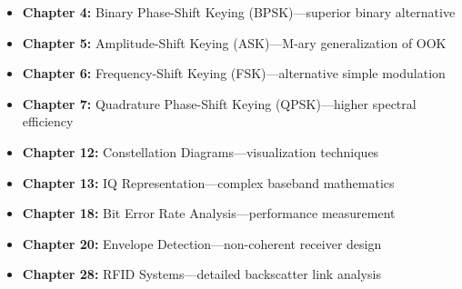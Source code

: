 \begin{itemize}
\item \textbf{Chapter 4:} Binary Phase-Shift Keying (BPSK)---superior binary alternative
\item \textbf{Chapter 5:} Amplitude-Shift Keying (ASK)---M-ary generalization of OOK
\item \textbf{Chapter 6:} Frequency-Shift Keying (FSK)---alternative simple modulation
\item \textbf{Chapter 7:} Quadrature Phase-Shift Keying (QPSK)---higher spectral efficiency
\item \textbf{Chapter 12:} Constellation Diagrams---visualization techniques
\item \textbf{Chapter 13:} IQ Representation---complex baseband mathematics
\item \textbf{Chapter 18:} Bit Error Rate Analysis---performance measurement
\item \textbf{Chapter 20:} Envelope Detection---non-coherent receiver design
\item \textbf{Chapter 28:} RFID Systems---detailed backscatter link analysis
\end{itemize}
